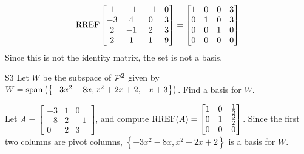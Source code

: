 \documentclass{sbgLAsemi}
\begin{document}
\begin{solution}
$$\RREF \begin{bmatrix} 1 & -1 & -1 & 0 \\ -3 & 4 & 0 & 3 \\ 2 & -1 & 2 & 3 \\ 2 & 1 & 1 & 9 \end{bmatrix}=\begin{bmatrix} 1 &0 & 0 & 3 \\ 0 & 1 & 0 & 3 \\ 0 & 0 & 1 & 0 \\ 0 & 0 & 0 & 0 \end{bmatrix}$$
Since this is not the identity matrix, the set is not a basis.
\end{solution}
\begin{problem}{S3}
Let $W$ be the subspace of $\P^2$ given by $W = {\rm span} \left( \left\{  -3x^2-8x, x^2+2x+2, -x+3\right\} \right)$.   Find a basis for $W$.
\end{problem}
\begin{solution}
Let $A= \begin{bmatrix}-3 & 1 & 0 \\ -8 & 2 & -1 \\ 0 & 2 & 3\end{bmatrix}$, and compute $\RREF(A) = \begin{bmatrix} 1 & 0 & \frac{1}{2} \\ 0 & 1 & \frac{3}{2} \\ 0 & 0 & 0 \end{bmatrix}$.
Since the first two columns are pivot columns, $\left\{ -3x^2-8x, x^2+2x+2\right\} $ is a basis for $W$.
\end{solution}
\end{document}
